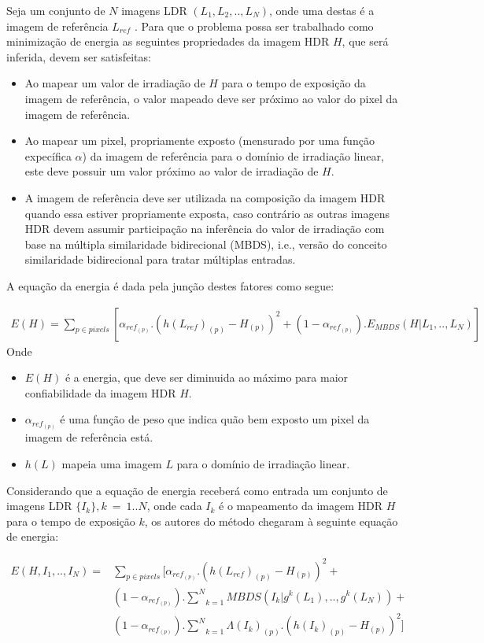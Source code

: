 Seja um conjunto de $N$ imagens LDR $(L_1,L_2,..,L_N)$, onde uma destas é a imagem de referência $L_{ref}$ . Para que o problema possa ser trabalhado como minimização de energia as seguintes propriedades da imagem HDR $H$, que será inferida, devem ser satisfeitas:

\begin{itemize}
	\item Ao mapear um valor de irradiação de $H$ para o tempo de exposição da imagem de referência, o valor mapeado deve ser próximo ao valor do pixel da imagem de referência.
	\item Ao mapear um pixel, propriamente exposto (mensurado por uma função expecífica $\alpha$) da imagem de referência para o domínio de irradiação linear, este deve possuir um valor próximo ao valor de irradiação de $H$.
	\item A imagem de referência deve ser utilizada na composição da imagem HDR quando essa estiver propriamente exposta, caso contrário as outras imagens HDR devem assumir participação na inferência do valor de irradiação com base na múltipla similaridade bidirecional (MBDS), i.e., versão do conceito similaridade bidirecional para tratar múltiplas entradas.
\end{itemize}

A equação da energia é dada pela junção destes fatores como segue:
 
\begin{align} \label{eqSenEnergia}
	E(H) = \sum\limits_{p \in pixels}{[\alpha_{ref_{(p)}}.(h(L_{ref})_{(p)} - H_{(p)})^2 + (1-\alpha_{ref_(p)}).E_{MBDS}(H|L_1,..,L_N)]}
\end{align}
Onde
\begin{itemize}
	\item $E(H)$ é a energia, que deve ser diminuida ao máximo para maior confiabilidade da imagem HDR $H$.
	\item $\alpha_{ref_{(p)}}$ é uma função de peso que indica quão bem exposto um pixel da imagem de referência está.
	\item $h(L)$ mapeia uma imagem $L$ para o domínio de irradiação linear. 
\end{itemize}

Considerando que a equação de energia receberá como entrada um conjunto de imagens LDR $\{I_k\}, k~=~1..N$, onde cada $I_k$ é o mapeamento da imagem HDR $H$ para o tempo de exposição $k$, os autores do método chegaram à seguinte equação de energia:

\begin{equation} \label{eqSenEnergia2}
\begin{split}
	E(H,I_1,..,I_N) = &\underset{p \in pixels}{\sum{}}[\alpha_{ref_{(p)}}.(h(L_{ref})_{(p)} - H_{(p)})^2 +\\
		   &(1-\alpha_{ref_(p)}).\underset{k=1}{\overset{N}{\sum{}}}MBDS(I_k|g^k(L_1),..,g^k(L_N)) +\\
		   &(1-\alpha_{ref_(p)}).\underset{k=1}{\overset{N}{\sum{}}}\Lambda(I_k)_{(p)}.(h(I_k)_{(p)} - H_{(p)})^2]
\end{split}
\end{equation}

